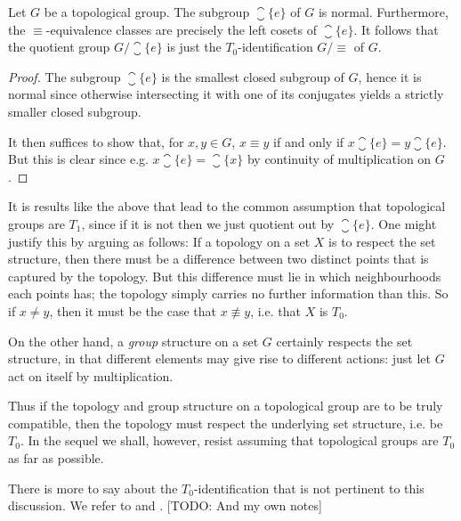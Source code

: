 \documentclass[article, a4paper, 11pt, oneside]{memoir}
\numberwithin{equation}{chapter}
\begin{document}
\begin{proposition}
    \label{thm:quotient-group-T0-identification}
    Let $G$ be a topological group. The subgroup $\closure{\{e\}}$ of $G$ is normal. Furthermore, the $\equiv$-equivalence classes are precisely the left cosets of $\closure{\{e\}}$. It follows that the quotient group $G / \closure{\{e\}}$ is just the $T_0$-identification $G/{\equiv}$ of $G$.
\end{proposition}

\begin{proof}
    The subgroup $\closure{\{e\}}$ is the smallest closed subgroup of $G$, hence it is normal since otherwise intersecting it with one of its conjugates yields a strictly smaller closed subgroup.

    It then suffices to show that, for $x,y \in G$, $x \equiv y$ if and only if $x \closure{\{e\}} = y \closure{\{e\}}$. But this is clear since e.g. $x \closure{\{e\}} = \closure{\{x\}}$ by continuity of multiplication on $G$.
\end{proof}

It is results like the above that lead to the common assumption that topological groups are $T_1$, since if it is not then we just quotient out by $\closure{\{e\}}$. One might justify this by arguing as follows: If a topology on a set $X$ is to respect the set structure, then there must be a difference between two distinct points that is captured by the topology. But this difference must lie in which neighbourhoods each points has; the topology simply carries no further information than this. So if $x \neq y$, then it must be the case that $x \not\equiv y$, i.e. that $X$ is $T_0$.

On the other hand, a \emph{group} structure on a set $G$ certainly respects the set structure, in that different elements may give rise to different actions: just let $G$ act on itself by multiplication.

Thus if the topology and group structure on a topological group are to be truly compatible, then the topology must respect the underlying set structure, i.e. be $T_0$. In the sequel we shall, however, resist assuming that topological groups are $T_0$ as far as possible.

There is more to say about the $T_0$-identification that is not pertinent to this discussion. We refer to \textcite[Exercise~13C]{willard} and \textcite{pirttimäki2019}. [TODO: And my own notes]


\end{document}
